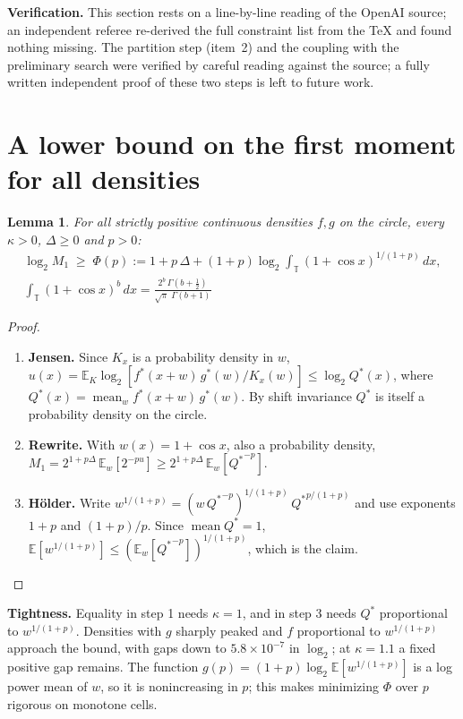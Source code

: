 \documentclass[11pt]{article}
\DeclareMathOperator{\mean}{mean}
\newcommand{\E}{\mathbb{E}}
\theoremstyle{plain}
\newtheorem{lemma}{Lemma}
\begin{document}
\textbf{Verification.} This section rests on a line-by-line reading of the OpenAI source; an independent referee re-derived the full constraint list from the \TeX{} and found nothing missing. The partition step (item~2) and the coupling with the preliminary search were verified by careful reading against the source; a fully written independent proof of these two steps is left to future work.

\section{A lower bound on the first moment for all densities}

\begin{lemma}
For all strictly positive continuous densities $f, g$ on the circle, every $\kappa > 0$, $\Delta \ge 0$ and $p > 0$:
\begin{gather*}
\log_2 M_1 \;\ge\; \Phi(p) := 1 + p\,\Delta + (1+p)\log_2 \int_{\mathbb T} (1+\cos x)^{1/(1+p)}\,dx, \\ \int_{\mathbb T} (1+\cos x)^b\,dx = \frac{2^b\,\Gamma(b+\tfrac12)}{\sqrt{\pi}\;\Gamma(b+1)}
\end{gather*}
\end{lemma}

\begin{proof}
\leavevmode
\begin{enumerate}
\item \textbf{Jensen.} Since $K_x$ is a probability density in $w$, $u(x) = \E_K \log_2[f^*(x+w)\, g^*(w) / K_x(w)] \le \log_2 Q^*(x)$, where $Q^*(x) = \mean_w f^*(x+w)\, g^*(w)$. By shift invariance $Q^*$ is itself a probability density on the circle.
\item \textbf{Rewrite.} With $w(x) = 1 + \cos x$, also a probability density, $M_1 = 2^{1+p \Delta}\, \E_w[2^{-p u}] \ge 2^{1+p \Delta}\, \E_w[{Q^*}^{-p}]$.
\item \textbf{H\"older.} Write $w^{1/(1+p)} = (w\, {Q^*}^{-p})^{1/(1+p)}\, {Q^*}^{p/(1+p)}$ and use exponents $1+p$ and $(1+p)/p$. Since $\mean Q^* = 1$, $\E[w^{1/(1+p)}] \le (\E_w[{Q^*}^{-p}])^{1/(1+p)}$, which is the claim. \qedhere
\end{enumerate}
\end{proof}

\textbf{Tightness.} Equality in step 1 needs $\kappa = 1$, and in step 3 needs $Q^*$ proportional to $w^{1/(1+p)}$. Densities with $g$ sharply peaked and $f$ proportional to $w^{1/(1+p)}$ approach the bound, with gaps down to $5.8\times10^{-7}$ in $\log_2$; at $\kappa = 1.1$ a fixed positive gap remains. The function $g(p) = (1+p) \log_2 \E[w^{1/(1+p)}]$ is a log power mean of $w$, so it is nonincreasing in $p$; this makes minimizing $\Phi$ over $p$ rigorous on monotone cells.
\end{document}

